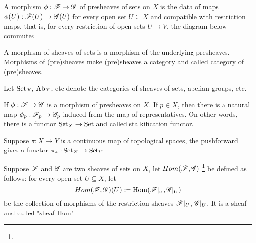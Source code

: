 \begin{definition}
	A morphism $\phi: \mathscr{F} \to \mathscr{G}$ of presheaves of sets on $X$ is the data of maps $\phi(U): \mathscr{F}(U) \to \mathscr{G}(U)$ for every open set $U \subseteq X$ and compatible with restriction maps, that is, for every restriction of open sets $U \to V$, the diagram below commutes
	\begin{center}
	\end{center}
	
	A morphism of sheaves of sets is a morphism of the underlying presheaves. Morphisms of (pre)sheaves make (pre)sheaves a category and called category of (pre)sheaves.
	
	Let $\operatorname{Set}_X$, $\operatorname{Ab}_X$, etc denote the categories of sheaves of sets, abelian groups, etc.
\end{definition}

\begin{proposition}
	If $\phi: \mathscr{F} \to \mathscr{G}$ is a morphism of presheaves on $X$. If $p \in X$, then there is a natural map $\phi_p: \mathscr{F}_p \to \mathscr{G}_p$ induced from the map of representatives. On other words, there is a functor $\operatorname{Set}_X \to \operatorname{Set}$ and called stalkification functor.
\end{proposition}

\begin{proposition}
	Suppose $\pi: X \to Y$ is a continuous map of topological spaces, the pushforward gives a functor $\pi_*: \operatorname{Set}_X \to \operatorname{Set}_Y$
\end{proposition}

\begin{definition}
	Suppose $\mathscr{F}$ and $\mathscr{G}$ are two sheaves of sets on $X$, let $Hom(\mathscr{F}, \mathscr{G})$ \footnote{} be defined as follows: for every open set $U \subseteq X$, let
	$$
		Hom(\mathscr{F}, \mathscr{G})(U) := \operatorname{Hom}(\mathscr{F}\vert_U, \mathscr{G}\vert_U)
	$$
	be the collection of morphisms of the restriction sheaves $\mathscr{F}\vert_U$, $\mathscr{G}\vert_U$. It is a sheaf and called "sheaf Hom"
\end{definition}

